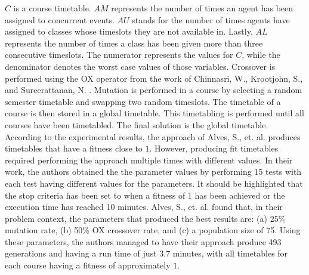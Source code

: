 $C$ is a course timetable. $AM$ represents the number of times an agent has been assigned to concurrent events. $AU$ stands for the number of times agents have assigned to classes whose timeslots they are not available in. Lastly, $AL$ represents the number of times a class has been given more than three consecutive timeslots. The numerator represents the values for $C$, while the denominator denotes the worst case values of those variables. Crossover is performed using the OX operator from the work of Chinnasri, W., Krootjohn, S., and Sureerattanan, N. \cite{wutthipong-performance-study-genetic-operators}. Mutation is performed in a course by selecting a random semester timetable and swapping two random timeslots. The timetable of a course is then stored in a global timetable. This timetabling is performed until all courses have been timetabled. The final solution is the global timetable. According to the experimental results, the approach of Alves, S., et. al. produces timetables that have a fitness close to $1$. However, producing fit timetables required performing the approach multiple times with different values. In their work, the authors obtained the the parameter values by performing 15 tests with each test having different values for the parameters. It should be highlighted that the stop criteria has been set to when a fitness of 1 has been achieved or the execution time has reached 10 minutes. Alves, S., et. al. found that, in their problem context, the parameters that produced the best results are: (a) 25\% mutation rate, (b) 50\% OX crossover rate, and (c) a population size of 75. Using these parameters, the authors managed to have their approach produce 493 generations and having a run time of just 3.7 minutes, with all timetables for each course having a fitness of approximately $1$.

